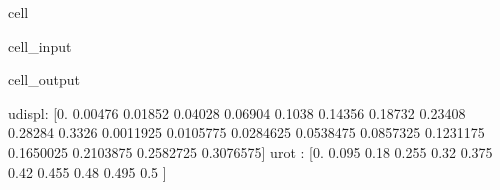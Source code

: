 \documentclass[letterpaper,10pt,english]{jupyterBook}
\begin{document}
\begin{sphinxuseclass}{cell}
\begin{sphinxVerbatimInput}
\begin{sphinxuseclass}{cell_input}
\begin{sphinxVerbatim}[commandchars=\\\{\}]
    
\PYG{p}{[}\PYG{p}{]}              
\PYG{p}{[}\PYG{p}{]}\PYG{p}{[}\PYG{p}{]}    
\PYG{p}{[}\PYG{p}{]}
\PYG{p}{[}\PYG{p}{]}
\PYG{p}{[}\PYG{p}{]}
\PYG{p}{[}\PYG{p}{]}
\PYG{p}{[}\PYG{p}{]}

\end{sphinxVerbatim}

\end{sphinxuseclass}\end{sphinxVerbatimInput}
\begin{sphinxVerbatimOutput}

\begin{sphinxuseclass}{cell_output}
\begin{sphinxVerbatim}[commandchars=\\\{\}]
u\PYGZus{}displ: [0.        0.00476   0.01852   0.04028   0.06904   0.1038    0.14356
 0.18732   0.23408   0.28284   0.3326    0.0011925 0.0105775 0.0284625
 0.0538475 0.0857325 0.1231175 0.1650025 0.2103875 0.2582725 0.3076575]
u\PYGZus{}rot  : [0.    0.095 0.18  0.255 0.32  0.375 0.42  0.455 0.48  0.495 0.5  ]
\end{sphinxVerbatim}

\noindent{}

\end{sphinxuseclass}\end{sphinxVerbatimOutput}

\end{sphinxuseclass}
\sphinxstepscope
\end{document}
